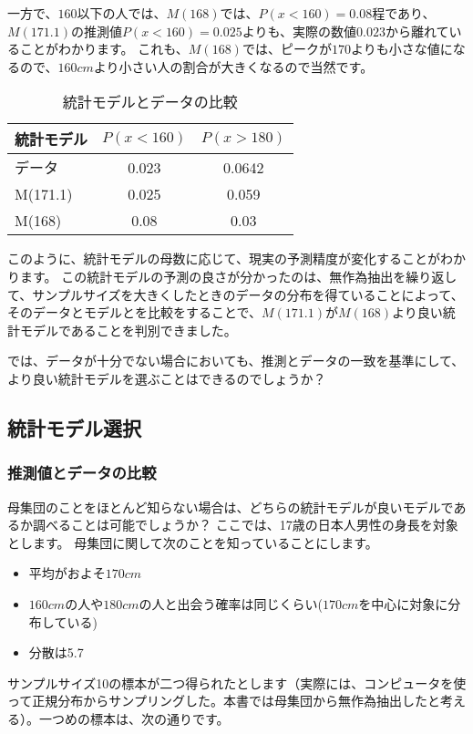 \documentclass[a4paper,11pt,dvipdfmx]{jsarticle}
\begin{document}
一方で、$160$以下の人では、$M(168)$では、$P(x<160)=0.08$程であり、$M(171.1)$の推測値$P(x<160)=0.025$よりも、実際の数値$0.023$から離れていることがわかります。
これも、$M(168)$では、ピークが$170$よりも小さな値になるので、$160cm$より小さい人の割合が大きくなるので当然です。

\begin{table}[hbtp]
    \caption{統計モデルとデータの比較}
    \label{table:data_type}
    \centering
    \begin{tabular}{lcc}
    統計モデル  & $P(x<160)$  & $P(x>180)$   \\
    \hline \hline
    データ &  0.023 &  0.0642\\
    M(171.1) & 0.025 & 0.059  \\
    M(168) &  0.08 & 0.03 \\
      \hline
    \end{tabular}
  \end{table}

このように、統計モデルの母数に応じて、現実の予測精度が変化することがわかります。
この統計モデルの予測の良さが分かったのは、無作為抽出を繰り返して、サンプルサイズを大きくしたときのデータの分布を得ていることによって、
そのデータとモデルとを比較をすることで、$M(171.1)$が$M(168)$より良い統計モデルであることを判別できました。

では、データが十分でない場合においても、推測とデータの一致を基準にして、より良い統計モデルを選ぶことはできるのでしょうか？
\subsection{統計モデル選択}
\subsubsection{推測値とデータの比較}
母集団のことをほとんど知らない場合は、どちらの統計モデルが良いモデルであるか調べることは可能でしょうか？
ここでは、17歳の日本人男性の身長を対象とします。
母集団に関して次のことを知っていることにします。
\begin{itemize}
    \item 平均がおよそ$170cm$
    \item $160cm$の人や$180cm$の人と出会う確率は同じくらい($170cm$を中心に対象に分布している)
    \item 分散は5.7
\end{itemize}

サンプルサイズ10の標本が二つ得られたとします（実際には、コンピュータを使って正規分布からサンプリングした。本書では母集団から無作為抽出したと考える）。一つめの標本は、次の通りです。
\end{document}
